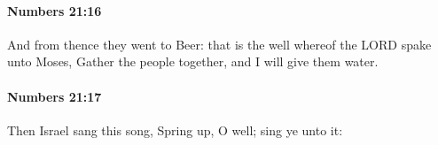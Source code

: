 		\paragraph{Numbers 21:16} %
			\label{NUMBERS-21-16}

			And from thence they went to Beer: that is the well whereof the LORD spake unto Moses, Gather the people together, and I will give them water.


		\paragraph{Numbers 21:17} %
			\label{NUMBERS-21-17}

			Then Israel sang this song, Spring up, O well; sing ye unto it:


